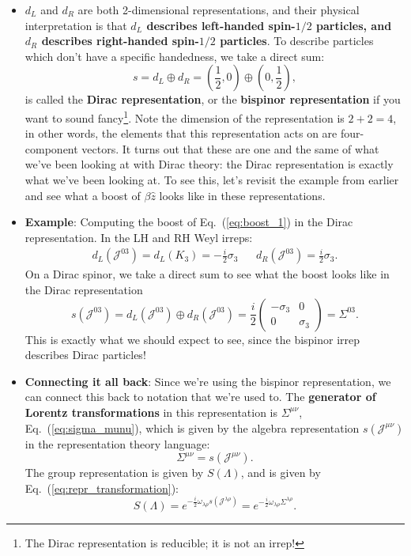 \documentclass[12pt, oneside]{article}   	%
\theoremstyle{definition}
\begin{document}
\begin{itemize}
	\item $d_L$ and $d_R$ are both 2-dimensional representations, and their physical interpretation is that \textbf{$d_L$ describes left-handed spin-$1/2$ particles, and $d_R$ describes right-handed spin-$1/2$ particles}. To describe particles which don't have a specific handedness, we take a direct sum:
	\begin{equation}
		s = d_L\oplus d_R = \left(\frac{1}{2}, 0\right)\oplus \left(0, \frac{1}{2} \right),
	\end{equation}
	is called the \textbf{Dirac representation}, or the \textbf{bispinor representation} if you want to sound fancy\footnote{The Dirac representation is reducible; it is not an irrep! }. Note the dimension of the representation is $2 + 2 = 4$, in other words, the elements that this representation acts on are four-component vectors. It turns out that these are one and the same of what we've been looking at with Dirac theory: the Dirac representation is exactly what we've been looking at. To see this, let's revisit the example from earlier and see what a boost of $\beta\hat z$ looks like in these representations. 
	
	\item \textbf{Example}: Computing the boost of Eq.~(\ref{eq:boost_1}) in the Dirac representation. In the LH and RH Weyl irreps:
	\begin{align}
		d_L(\mathcal J^{03}) = d_L(K_3) = -\frac{i}{2} \sigma_3 && d_R(\mathcal J^{03}) = \frac{i}{2} \sigma_3.
	\end{align}
	On a Dirac spinor, we take a direct sum to see what the boost looks like in the Dirac representation
	\begin{equation}
		s(\mathcal J^{03}) = d_L(\mathcal J^{03})\oplus d_R(\mathcal J^{03}) = \frac{i}{2} \begin{pmatrix} -\sigma_3 & 0 \\ 0 & \sigma_3 \end{pmatrix} = \Sigma^{03}.
	\end{equation}
	This is exactly what we should expect to see, since the bispinor irrep describes Dirac particles!
	
	\item \textbf{Connecting it all back}: Since we're using the bispinor representation, we can connect this back to notation that we're used to. The \textbf{generator of Lorentz transformations} in this representation is $\Sigma^{\mu\nu}$, Eq.~(\ref{eq:sigma_munu}), which is given by the algebra representation $s(\mathcal J^{\mu\nu})$ in the representation theory language:
	\begin{equation}
		\Sigma^{\mu\nu} = s(\mathcal J^{\mu\nu}).
	\end{equation}
	The group representation is given by $S(\Lambda)$, and is given by Eq.~(\ref{eq:repr_transformation}):
	\begin{equation}
		S(\Lambda) = e^{-\frac{i}{2} \omega_{\lambda\rho} s(\mathcal J^{\lambda\rho})} = e^{-\frac{i}{2} \omega_{\lambda\rho}\Sigma^{\lambda\rho}}.
	\end{equation}

\end{itemize}
\end{document}
